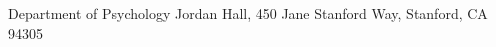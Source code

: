 \address{Stanford University}{Department of Psychology}%
    {Jordan Hall, 450 Jane Stanford Way, Stanford, CA 94305}
